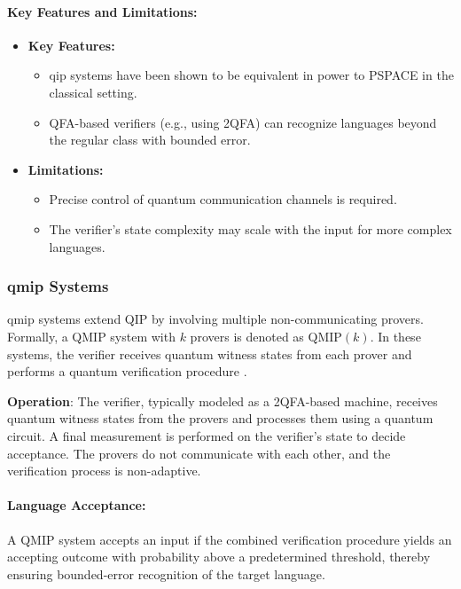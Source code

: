 \paragraph{Key Features and Limitations:}
\begin{itemize}
    \item \textbf{Key Features:}
    \begin{itemize}
        \item \gls{qip} systems have been shown to be equivalent in power to PSPACE in the classical setting.
        \item QFA-based verifiers (e.g., using 2QFA) can recognize languages beyond the regular class with bounded error.
    \end{itemize}
    \item \textbf{Limitations:}
    \begin{itemize}
        \item Precise control of quantum communication channels is required.
        \item The verifier’s state complexity may scale with the input for more complex languages.
    \end{itemize}
\end{itemize}

\subsubsection{\gls{qmip} Systems}
\label{sssec:qmip}
\begin{definition}
    \gls{qmip} systems extend QIP by involving multiple non-communicating provers. Formally, a QMIP system with \( k \) provers is denoted as \(\text{QMIP}(k)\). In these systems, the verifier receives quantum witness states from each prover and performs a quantum verification procedure \cite{scegulnaja2010postselection, yamakami2014constant}.
\end{definition}

\textbf{Operation}:  
The verifier, typically modeled as a 2QFA-based machine, receives quantum witness states from the provers and processes them using a quantum circuit. A final measurement is performed on the verifier’s state to decide acceptance. The provers do not communicate with each other, and the verification process is non-adaptive.

\paragraph{Language Acceptance:}  
A QMIP system accepts an input if the combined verification procedure yields an accepting outcome with probability above a predetermined threshold, thereby ensuring bounded-error recognition of the target language.

